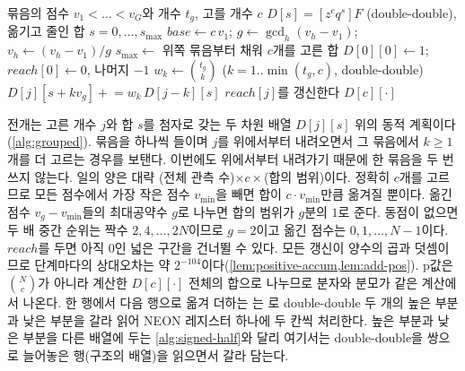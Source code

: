 \begin{algorithm}[htbp]
\begin{algorithmic}[1]
\Require 묶음의 점수 $v_1<\dots<v_G$와 개수 $t_g$, 고를 개수 $c$
\Ensure $D[s]=[z^cq^s]F$ (double-double), 옮기고 줄인 합 $s=0,\dots,s_{\max}$
\State $\mathit{base}\gets c\,v_1$; $g\gets\gcd_h(v_h-v_1)$; $v_h\gets(v_h-v_1)/g$ 
\State $s_{\max}\gets$ 위쪽 묶음부터 채워 $c$개를 고른 합 
\State $D[0][0]\gets1$; $\mathit{reach}[0]\gets0$, 나머지 $-1$ 
  \State $w_k\gets\binom{t_g}k$ ($k=1..\min(t_g,c)$, double-double)
   
      \State $D[j][s+kv_g]\mathrel{+}=w_k\,D[j-k][s]$ 
    \EndFor
    \State $\mathit{reach}[j]$를 갱신한다
  \EndFor
\EndFor
\State \Return $D[c][\cdot]$
\end{algorithmic}
\caption{동점이 있는 점수합의 분포 (stardust 의 )}
\label{alg:grouped}
\end{algorithm}

전개는 고른 개수 $j$와 합 $s$를 첨자로 갖는 두 차원 배열 $D[j][s]$ 위의 동적 계획이다(\cref{alg:grouped}). 묶음을 하나씩 들이며 $j$를 위에서부터 내려오면서 그 묶음에서 $k\ge1$개를 더 고르는 경우를 보탠다. 이번에도 위에서부터 내려가기 때문에 한 묶음을 두 번 쓰지 않는다. 일의 양은 대략 (전체 관측 수)$\times c\times$(합의 범위)이다. 정확히 $c$개를 고르므로 모든 점수에서 가장 작은 점수 $v_{\min}$을 빼면 합이 $c\cdot v_{\min}$만큼 옮겨질 뿐이다. 옮긴 점수 $v_g-v_{\min}$들의 최대공약수 $g$로 나누면 합의 범위가 $g$분의 $1$로 준다. 동점이 없으면 두 배 중간 순위는 짝수 $2,4,\dots,2N$이므로 $g=2$이고 옮긴 점수는 $0,1,\dots,N-1$이다. $\mathit{reach}$를 두면 아직 $0$인 넓은 구간을 건너뛸 수 있다. 모든 갱신이 양수의 곱과 덧셈이므로 단계마다의 상대오차는 약 $2^{-104}$이다(\cref{lem:positive-accum,lem:add-pos}). p값은 $\binom Nc$가 아니라 계산한 $D[c][\cdot]$ 전체의 합으로 나누므로 분자와 분모가 같은 계산에서 나온다. 한 행에서 다음 행으로 옮겨 더하는 는 로 double-double 두 개의 높은 부분과 낮은 부분을 갈라 읽어 NEON 레지스터 하나에 두 칸씩 처리한다. 높은 부분과 낮은 부분을 다른 배열에 두는 \cref{alg:signed-half}와 달리 여기서는 double-double을 쌍으로 늘어놓은 행(구조의 배열)을 읽으면서 갈라 담는다.

